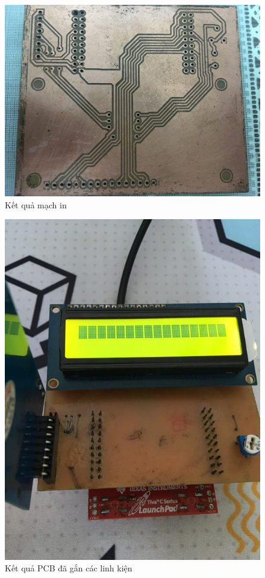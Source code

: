 \begin{figure}[ht]
\centering
\includegraphics[scale=0.3]{images/board_output.jpg}
\caption{Kết quả mạch in}
\label{fig:pcb_out}
\end{figure}

\begin{figure}[ht]
\centering
\includegraphics[scale=0.3]{images/board_finish.jpg}
\caption{Kết quả PCB đã gắn các linh kiện}
\label{fig:system}
\end{figure}

